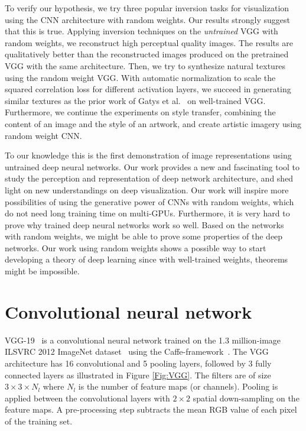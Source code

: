 \documentclass{article}
\begin{document}
To verify our hypothesis, we try three popular inversion tasks for visualization using the CNN architecture with random weights. Our results strongly suggest that this is true.
Applying inversion techniques on the \emph{untrained} VGG with random weights, we
 reconstruct high perceptual quality images. The results are qualitatively better than the reconstructed images produced on the pretrained VGG with the same architecture.
Then, we try to synthesize natural textures using the random weight VGG. With automatic normalization to scale the squared correlation loss for different activation layers, we succeed in generating similar textures as the prior work of Gatys et al.~\cite{Gatys2015texture} on well-trained VGG.
Furthermore, we continue the experiments on style transfer, combining the content of an image and the style of an artwork,
and create artistic imagery using random weight CNN.

To our knowledge this is the first demonstration of image representations using untrained deep neural networks.
 Our work  provides a new and fascinating tool to study the perception and representation of deep network architecture, and
shed light on new understandings on deep visualization. %
 Our work will inspire more possibilities of using the generative power of CNNs with random weights, which do not need long training time on multi-GPUs.
 Furthermore, it is very hard to prove why trained deep neural networks work so well.
 Based on the networks with random weights, we might be able to prove some properties of the deep networks.  Our work using random weights shows a possible way to start developing a theory of deep learning since with well-trained weights, theorems might be impossible.




\vspace{-0.5em}
\section{Convolutional neural network}
\label{sec:network}
%

VGG-19~\cite{Simonyan14VGG} is a convolutional neural network trained on the 1.3 million-image ILSVRC 2012 ImageNet dataset~\cite{ILSVRC} using the Caffe-framework~\cite{jia2014caffe}.
The VGG architecture has 16 convolutional and 5 pooling layers, followed by 3 fully connected layers as illustrated in Figure \ref{Fig:VGG}. The filters are of size $3 \times 3 \times N_l$  where $N_l$ is the number of feature maps (or channels). Pooling is applied between the convolutional layers with $2 \times 2$ spatial down-sampling on the feature maps.
A pre-processing step subtracts the mean RGB value of each pixel of the training set.%
\end{document}
